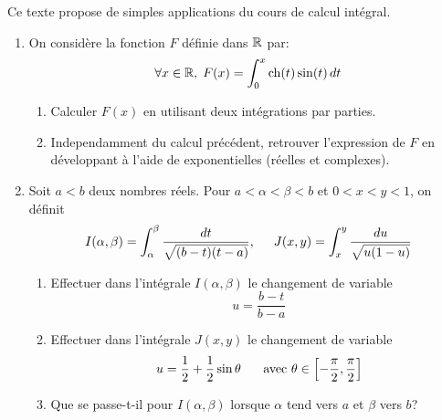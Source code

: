 Ce texte propose de simples applications du cours de calcul intégral.
\begin{enumerate}
  \item On considère la fonction $F$ définie dans $\mathbb{R}$ par:
\begin{displaymath}
  \forall x \in \mathbb{R},\;F(x) = \int_{0}^{x}\operatorname{ch}(t)\sin(t)\,dt
\end{displaymath}
\begin{enumerate}
  \item Calculer $F(x)$ en utilisant deux intégrations par parties.
  \item Independamment du calcul précédent, retrouver l'expression de $F$ en développant à l'aide de exponentielles (réelles et complexes).
\end{enumerate}

\item Soit $a < b $ deux nombres réels. Pour $a < \alpha < \beta < b$ et $0 < x < y < 1$, on définit
\begin{displaymath}
  I(\alpha,\beta) = \int_{\alpha}^{\beta}\frac{dt}{\sqrt{(b-t)(t-a)}}, \hspace{0.5cm}
  J(x,y) = \int_{x}^{y}\frac{du}{\sqrt{u(1-u)}}
\end{displaymath}
\begin{enumerate}
  \item Effectuer dans l'intégrale $I(\alpha,\beta)$ le changement de variable
  \begin{displaymath}
    u = \frac{b-t}{b-a}
  \end{displaymath}
  
  \item  Effectuer dans l'intégrale $J(x,y)$ le changement de variable
  \begin{displaymath}
    u = \frac{1}{2} + \frac{1}{2}\sin \theta \hspace{0.5cm}\text{ avec } \theta \in \left[ -\frac{\pi}{2}, \frac{\pi}{2}\right] 
  \end{displaymath}
  
  \item Que se passe-t-il pour $I(\alpha,\beta)$ lorsque $\alpha$ tend vers $a$ et $\beta$ vers $b$?
\end{enumerate}

\end{enumerate}
